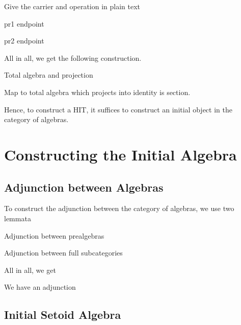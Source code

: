 \documentclass[9pt]{entcs}
\newcommand{\1}{\type{1}} %
\begin{document}
Give the carrier and operation in plain text

\begin{lemma}
pr1 endpoint
\end{lemma}

\begin{lemma}
pr2 endpoint
\end{lemma}

All in all, we get the following construction.

\begin{theorem}
Total algebra and projection
\end{theorem}

\begin{proposition}
Map to total algebra which projects into identity is section.
\end{proposition}

Hence, to construct a HIT, it suffices to construct an initial object in the category of algebras.

\begin{corollary}
	
\end{corollary}

\section{Constructing the Initial Algebra}

\subsection{Adjunction between Algebras}
To construct the adjunction between the category of algebras, we use two lemmata

\begin{lemma}
Adjunction between prealgebras
\end{lemma}

\begin{lemma}
Adjunction between full subcategories
\end{lemma}

All in all, we get

\begin{proposition}
We have an adjunction
\end{proposition}

\subsection{Initial Setoid Algebra}
\end{document}
